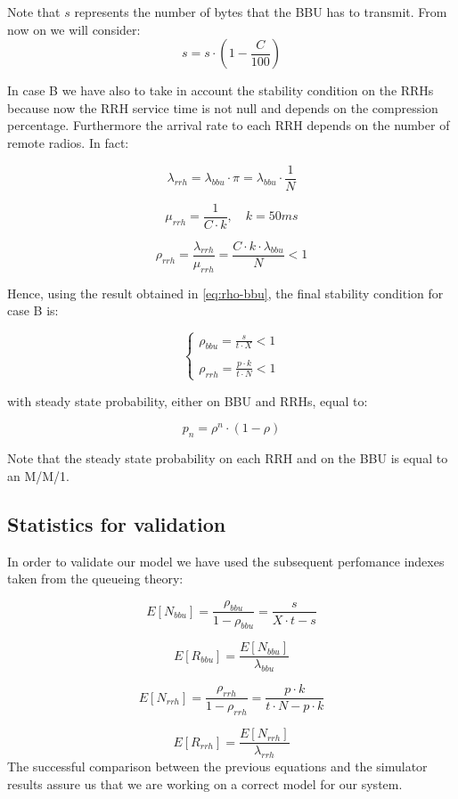 \documentclass[11pt,a4paper,oneside, openright]{article}
\begin{document}
Note that $s$ represents the number of bytes that the BBU has to transmit. From now on we will consider:
$$s = s\cdot(1-\frac{C}{100})$$

In case B we have also to take in account the stability condition on the RRHs because now the RRH service time is not null and depends on the compression percentage. Furthermore the arrival rate to each RRH depends on the number of remote radios. In fact:

$$ \lambda_{rrh} = \lambda_{bbu} \cdot \pi = \lambda_{bbu} \cdot \frac{1}{N} $$

$$ \mu_{rrh} = \frac{1}{C \cdot k}, \quad k = 50ms $$

\begin{equation}
\rho_{rrh} = \frac{\lambda_{rrh}}{\mu_{rrh}} = \frac{C \cdot k \cdot \lambda_{bbu}}{N} < 1
\end{equation}

Hence, using the result obtained in \eqref{eq:rho-bbu}, the final stability condition for case B is:

$$ \begin{cases} \rho_{bbu} = \frac{s}{t \cdot X} < 1 \\ \\ \rho_{rrh} = \frac{p \cdot k}{t \cdot N} < 1 \end{cases} $$

with steady state probability, either on BBU and RRHs, equal to:

$$ p_{n} = \rho^n \cdot (1 - \rho) $$

Note that the steady state probability on each RRH and on the BBU is equal to an M/M/1.


\subsection{Statistics for validation}
In order to validate our model we have used the subsequent perfomance indexes taken from the queueing theory:

$$ E[N_{bbu}] = \frac{\rho_{bbu}}{1 - \rho_{bbu}} = \frac{s}{X \cdot t - s}$$

$$ E[R_{bbu}] = \frac{E[N_{bbu}]}{\lambda_{bbu}} $$

$$ E[N_{rrh}] = \frac{\rho_{rrh}}{1 - \rho_{rrh}} = \frac{p \cdot k}{t \cdot N - p \cdot k}$$

$$ E[R_{rrh}] = \frac{E[N_{rrh}]}{\lambda_{rrh}} $$
The successful comparison between the previous equations and the simulator results assure us that we are working on a correct model for our system.
\end{document}
